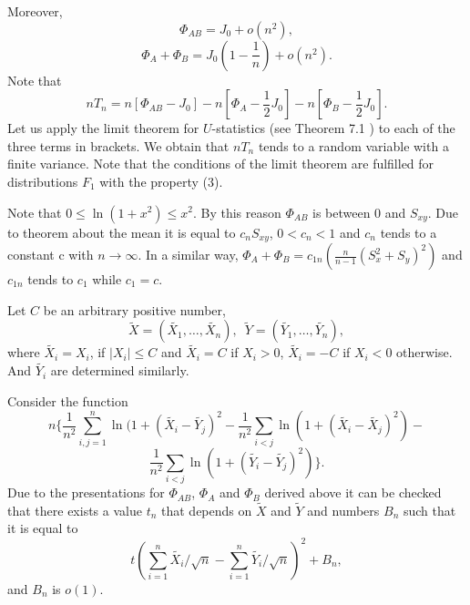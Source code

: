 \documentclass{svproc}
\begin{document}
Moreover,
$$
\Phi_{AB}= J_0 +  o(n^2),
$$
$$
\Phi_{A}+ \Phi_{B}=J_0(1-\frac{1}{n}) +  o(n^2).
$$
Note that
$$
nT_n=n[\Phi_{AB}-J_0] -n[\Phi_{A}-\frac{1}{2}J_0]-n[\Phi_{B}- \frac{1}{2}J_0].
$$
Let us apply the limit theorem for $U$-statistics (see Theorem 7.1 \cite{Hoeffding}) to each of the three terms in brackets. We obtain that $nT_n$ tends to a random variable with a finite variance. Note that the conditions of the limit theorem are fulfilled for distributions $F_1$ with the property (3). 

 Note that  $0 \leq \ln (1+x^2) \leq x^2$.  By this reason
$\Phi_{AB}$ is between 0 and $S_{xy}$. Due to theorem about the mean it is equal to $c_nS_{xy}$, $0<c_n<1$ and $c_n$ tends to a constant c with $n \to \infty$. In a similar way, 
$\Phi_{A}+ \Phi_{B}= c_{1n}(\frac{n}{n-1}(S_x^2+S_y)^2)$
and $c_{1n}$ tends to $c_1$ while $c_1=c$.

Let  $C$ be an arbitrary positive number,
$$
\tilde{X}=(\tilde{X_{1}},\ldots,\tilde{X_{n}}),\,\,\,
\tilde{Y}=(\tilde{Y_{1}},\ldots, \tilde{Y_{n}}),
$$
where $\tilde{X_{i}}=X_{i}$, if $
|X_{i}| \leq C$ and
 $\tilde{X_i}=C$ if $X_{i}>0$,
  $\tilde{X_i}=-C$ if $X_{i}<0$ otherwise. And $\tilde{Y_{i}}$ are determined similarly. 
  

 
 Consider the function
\begin{equation}\label{T_n1}
n\{\frac{1}{n^2}\sum_{i,j=1}^n \ln(1 + (\tilde{X_{i}} - \tilde{Y_j})^2 -\frac{1}{n^2}\sum_{i<j} \ln(1 + (\tilde{X_i} - \tilde{X_j})^2) -
\end{equation}
\begin{equation}\label{T_n2}
 \frac{1}{n^2}\sum_{i<j}  \ln(1 + (\tilde{Y_i} - \tilde{Y_j})^2)\}.
\end{equation} 
Due to the presentations for   $\Phi_{AB}$, $\Phi_{A}$ and $\Phi_{B}$ derived above it can be checked that there exists a value $t_n$ that depends on $\tilde{X}$ and $\tilde{Y}$ and numbers  $B_n$  such that it is equal to
\begin{equation}\label{T_n3} 
  t(\sum_{i=1}^n \tilde{X_{i}}/\sqrt{n}-\sum_{i=1}^n \tilde{Y_{i}}/\sqrt{n})^2 + B_n,
\end{equation}
and $B_n$ is $o(1)$.
\end{document}
